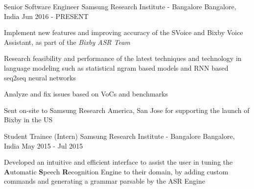 

\begin{cventries}

  \cventry
    {Senior Software Engineer} %
    {Samsung Research Institute - Bangalore} %
    {Bangalore, India} %
    {Jun 2016 - PRESENT} %
    {
      \begin{cvitems}
      \item{Implement new features and improving accuracy of the SVoice and Bixby Voice Assistant, as part of the \textit{Bixby ASR Team}}
      \item{Research feasibility and performance of the latest techniques and technology in language modeling such as statistical ngram based models and RNN based seq2seq neural networks}
      \item{Analyze and fix issues based on VoCs and benchmarks}
      \item{Sent on-site to Samsung Research America, San Jose for supporting the launch of Bixby in the US}
      \end{cvitems}
    }

  \cventry
    {Student Trainee (Intern)} %
    {Samsung Research Institute - Bangalore} %
    {Bangalore, India} %
    {May 2015 - Jul 2015} %
    {
      \begin{cvitems}
      \item{Developed an intuitive and efficient interface to assist the user in tuning the \textbf{A}utomatic  \textbf{S}peech \textbf{R}ecognition Engine to their domain, by adding custom commands and generating a grammar parsable by the ASR  Engine}
      \end{cvitems}
    }


\end{cventries}
